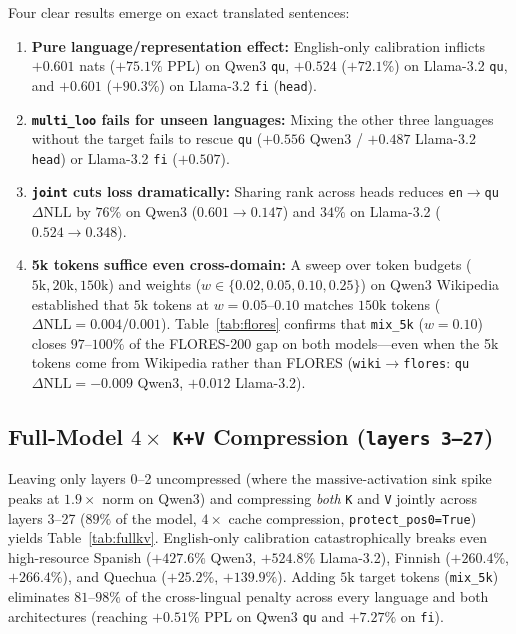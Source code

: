 \documentclass[11pt,a4paper,twocolumn]{article}
\begin{document}
Four clear results emerge on exact translated sentences:
\begin{enumerate}
  \item \textbf{Pure language/representation effect:} English-only calibration inflicts $+0.601$ nats ($+75.1\%$ PPL) on Qwen3 \texttt{qu}, $+0.524$ ($+72.1\%$) on Llama-3.2 \texttt{qu}, and $+0.601$ ($+90.3\%$) on Llama-3.2 \texttt{fi} (\texttt{head}).
  \item \textbf{\texttt{multi\_loo} fails for unseen languages:} Mixing the other three languages without the target fails to rescue \texttt{qu} ($+0.556$ Qwen3 / $+0.487$ Llama-3.2 \texttt{head}) or Llama-3.2 \texttt{fi} ($+0.507$).
  \item \textbf{\texttt{joint} cuts loss dramatically:} Sharing rank across heads reduces \texttt{en}$\rightarrow$\texttt{qu} $\Delta\text{NLL}$ by $76\%$ on Qwen3 ($0.601\rightarrow 0.147$) and $34\%$ on Llama-3.2 ($0.524\rightarrow 0.348$).
  \item \textbf{5k tokens suffice even cross-domain:} A sweep over token budgets ($5\text{k}, 20\text{k}, 150\text{k}$) and weights ($w \in \{0.02, 0.05, 0.10, 0.25\}$) on Qwen3 Wikipedia established that $5\text{k}$ tokens at $w=0.05$--$0.10$ matches $150\text{k}$ tokens ($\Delta\text{NLL}=0.004/0.001$). Table~\ref{tab:flores} confirms that \texttt{mix\_5k} ($w=0.10$) closes $97$--$100\%$ of the FLORES-200 gap on both models---even when the 5k tokens come from Wikipedia rather than FLORES (\texttt{wiki$\rightarrow$flores}: \texttt{qu} $\Delta\text{NLL}=-0.009$ Qwen3, $+0.012$ Llama-3.2).
\end{enumerate}

\subsection{Full-Model $4\times$ \texttt{K+V} Compression (\texttt{layers 3--27})}
Leaving only layers 0--2 uncompressed (where the massive-activation sink spike peaks at $1.9\times$ norm on Qwen3) and compressing \emph{both} \texttt{K} and \texttt{V} jointly across layers 3--27 ($89\%$ of the model, $4\times$ cache compression, \texttt{protect\_pos0=True}) yields Table~\ref{tab:fullkv}. English-only calibration catastrophically breaks even high-resource Spanish ($+427.6\%$ Qwen3, $+524.8\%$ Llama-3.2), Finnish ($+260.4\%$, $+266.4\%$), and Quechua ($+25.2\%$, $+139.9\%$). Adding $5\text{k}$ target tokens (\texttt{mix\_5k}) eliminates $81$--$98\%$ of the cross-lingual penalty across every language and both architectures (reaching $+0.51\%$ PPL on Qwen3 \texttt{qu} and $+7.27\%$ on \texttt{fi}).
\end{document}
